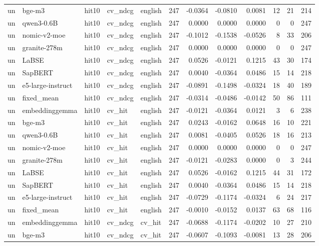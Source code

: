 \begin{tabular}{lllllrrrrrrr}
un & bge-m3 & hit10 & cv\_ndcg & english & 247 & -0.0364 & -0.0810 & 0.0081 & 12 & 21 & 214 \\
un & qwen3-0.6B & hit10 & cv\_ndcg & english & 247 & 0.0000 & 0.0000 & 0.0000 & 0 & 0 & 247 \\
un & nomic-v2-moe & hit10 & cv\_ndcg & english & 247 & -0.1012 & -0.1538 & -0.0526 & 8 & 33 & 206 \\
un & granite-278m & hit10 & cv\_ndcg & english & 247 & 0.0000 & 0.0000 & 0.0000 & 0 & 0 & 247 \\
un & LaBSE & hit10 & cv\_ndcg & english & 247 & 0.0526 & -0.0121 & 0.1215 & 43 & 30 & 174 \\
un & SapBERT & hit10 & cv\_ndcg & english & 247 & 0.0040 & -0.0364 & 0.0486 & 15 & 14 & 218 \\
un & e5-large-instruct & hit10 & cv\_ndcg & english & 247 & -0.0891 & -0.1498 & -0.0324 & 18 & 40 & 189 \\
un & fixed\_mean & hit10 & cv\_ndcg & english & 247 & -0.0314 & -0.0486 & -0.0142 & 50 & 86 & 111 \\
un & embeddinggemma & hit10 & cv\_hit & english & 247 & -0.0121 & -0.0364 & 0.0121 & 3 & 6 & 238 \\
un & bge-m3 & hit10 & cv\_hit & english & 247 & 0.0243 & -0.0162 & 0.0648 & 16 & 10 & 221 \\
un & qwen3-0.6B & hit10 & cv\_hit & english & 247 & 0.0081 & -0.0405 & 0.0526 & 18 & 16 & 213 \\
un & nomic-v2-moe & hit10 & cv\_hit & english & 247 & 0.0000 & 0.0000 & 0.0000 & 0 & 0 & 247 \\
un & granite-278m & hit10 & cv\_hit & english & 247 & -0.0121 & -0.0283 & 0.0000 & 0 & 3 & 244 \\
un & LaBSE & hit10 & cv\_hit & english & 247 & 0.0526 & -0.0162 & 0.1215 & 44 & 31 & 172 \\
un & SapBERT & hit10 & cv\_hit & english & 247 & 0.0040 & -0.0364 & 0.0486 & 15 & 14 & 218 \\
un & e5-large-instruct & hit10 & cv\_hit & english & 247 & -0.0729 & -0.1174 & -0.0324 & 6 & 24 & 217 \\
un & fixed\_mean & hit10 & cv\_hit & english & 247 & -0.0010 & -0.0152 & 0.0137 & 63 & 68 & 116 \\
un & embeddinggemma & hit10 & cv\_ndcg & cv\_hit & 247 & -0.0688 & -0.1174 & -0.0202 & 10 & 27 & 210 \\
un & bge-m3 & hit10 & cv\_ndcg & cv\_hit & 247 & -0.0607 & -0.1093 & -0.0081 & 13 & 28 & 206 \\

\end{tabular}
